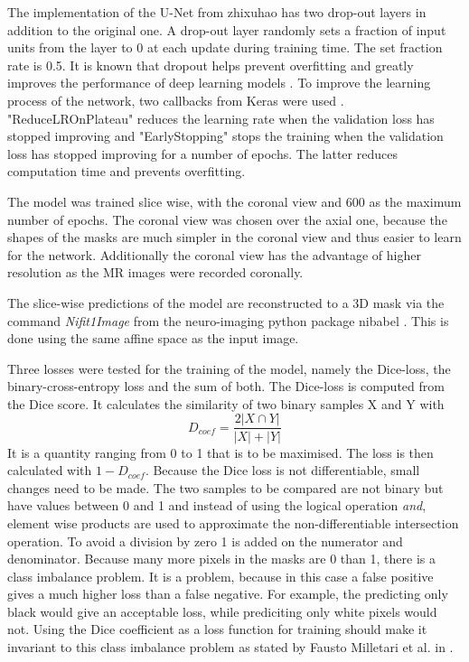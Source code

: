 \documentclass{article}
\begin{document}
The implementation of the U-Net from zhixuhao has two drop-out layers in addition to the original one.
A drop-out layer randomly sets a fraction of input units from the layer to 0 at each update during training time.
The set fraction rate is 0.5.
It is known that dropout helps prevent overfitting and greatly improves the performance of deep learning models \cite{srivastava_dropout:_nodate}.
To improve the learning process of the network, two callbacks from Keras were used \cite{noauthor_callbacks_nodate}. "ReduceLROnPlateau" reduces the learning rate when the validation loss has stopped improving and "EarlyStopping" stops the training when the validation loss has stopped improving for a number of epochs.
The latter reduces computation time and prevents overfitting.

The model was trained slice wise, with the coronal view and 600 as the maximum number of epochs.
The coronal view was chosen over the axial one, because the shapes of the masks are much simpler in the coronal view and thus easier to learn for the network.
Additionally the coronal view has the advantage of higher resolution as the MR images were recorded coronally.

The slice-wise predictions of the model are reconstructed to a 3D mask via the command \textit{Nifit1Image} from the neuro-imaging python package nibabel \cite{noauthor_neuroimaging_nodate}.
This is done using the same affine space as the input image.

Three losses were tested for the training of the model, namely the Dice-loss, the binary-cross-entropy loss and the sum of both.
The Dice-loss is computed from the Dice score. It calculates the similarity of two binary samples X and Y with
$$D_{coef} = \frac{2|X\cap Y|}{|X|+|Y|}$$
It is a quantity ranging from 0 to 1 that is to be maximised.
The loss is then calculated with $1-D_{coef}$.
Because the Dice loss is not differentiable, small changes need to be made.
The two samples to be compared are not binary but have values between 0 and 1 and instead of using the logical operation \textit{and}, element wise products are used to approximate the non-differentiable intersection operation.
To avoid a division by zero 1 is added on the numerator and denominator.
Because many more pixels in the masks are 0 than 1, there is a class imbalance problem.
It is a problem, because in this case a false positive gives a much higher loss than a false negative.
For example, the predicting only black would give an acceptable loss, while prediciting only white pixels would not.
Using the Dice coefficient as a loss function for training should make it invariant to this class imbalance problem as stated by Fausto Milletari et al. in \cite{milletari_v-net:_2016}.
\end{document}

